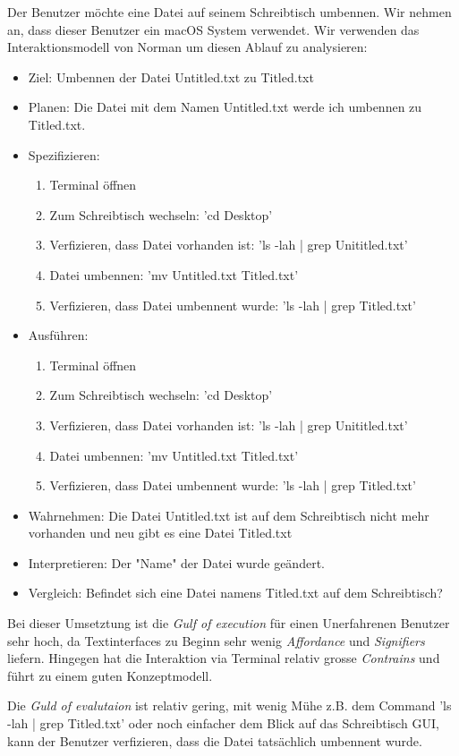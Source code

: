 Der Benutzer möchte eine Datei auf seinem Schreibtisch umbennen. Wir nehmen an,
dass dieser Benutzer ein macOS System verwendet. Wir verwenden
das Interaktionsmodell von Norman um diesen Ablauf zu analysieren:

\begin{itemize}
  \item Ziel: Umbennen der Datei Untitled.txt zu Titled.txt
  \item Planen: Die Datei mit dem Namen Untitled.txt werde ich umbennen zu
    Titled.txt.
  \item Spezifizieren: 
    \begin{enumerate}
      \item Terminal öffnen
      \item Zum Schreibtisch wechseln: 'cd Desktop'
      \item Verfizieren, dass Datei vorhanden ist: 'ls -lah | grep
        Unititled.txt'
      \item Datei umbennen: 'mv Untitled.txt Titled.txt'
      \item Verfizieren, dass Datei umbennent wurde: 'ls -lah | grep Titled.txt'
    \end{enumerate}
  \item Ausführen:
    \begin{enumerate}
      \item Terminal öffnen
      \item Zum Schreibtisch wechseln: 'cd Desktop'
      \item Verfizieren, dass Datei vorhanden ist: 'ls -lah | grep
        Unititled.txt'
      \item Datei umbennen: 'mv Untitled.txt Titled.txt'
      \item Verfizieren, dass Datei umbennent wurde: 'ls -lah | grep Titled.txt'
    \end{enumerate}
  \item Wahrnehmen: Die Datei Untitled.txt ist auf dem Schreibtisch nicht mehr
    vorhanden und neu gibt es eine Datei Titled.txt
  \item Interpretieren: Der "Name" der Datei wurde geändert.
  \item Vergleich: Befindet sich eine Datei namens Titled.txt auf dem
    Schreibtisch? 
\end{itemize}

Bei dieser Umsetztung ist die \textit{Gulf of execution} für einen Unerfahrenen
Benutzer sehr hoch, da Textinterfaces zu Beginn sehr wenig \textit{Affordance}
und \textit{Signifiers} liefern. Hingegen hat die Interaktion via Terminal
relativ grosse \textit{Contrains} und führt zu einem guten Konzeptmodell.

Die \textit{Guld of evalutaion} ist relativ gering, mit wenig Mühe z.B. dem
Command 'ls -lah | grep Titled.txt' oder noch einfacher dem Blick auf das
Schreibtisch GUI, kann der Benutzer verfizieren, dass die Datei tatsächlich
umbennent wurde. 
    

